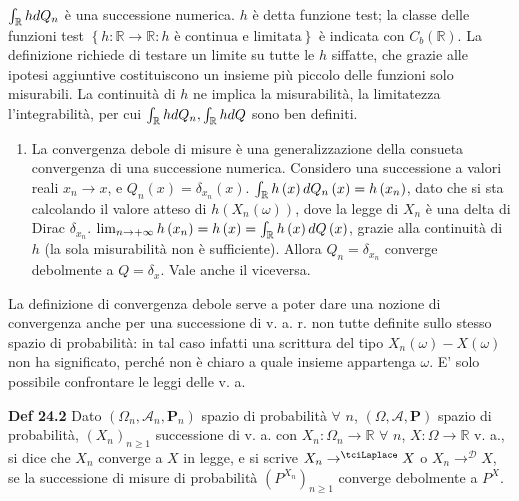 \documentclass{article}
\begin{document}
$\int_{%
\mathbb{R}
}hdQ_{n}$ \`{e} una successione numerica. $h$ \`{e} detta funzione test; la
classe delle funzioni test $\left\{ h:%
\mathbb{R}
\rightarrow 
\mathbb{R}
:h\text{ \`{e} continua e limitata}\right\} $ \`{e} indicata con $%
C_{b}\left( 
\mathbb{R}
\right) $. La definizione richiede di testare un limite su tutte le $h$
siffatte, che grazie alle ipotesi aggiuntive costituiscono un insieme pi\`{u}
piccolo delle funzioni solo misurabili. La continuit\`{a} di $h$ ne implica
la misurabilit\`{a}, la limitatezza l'integrabilit\`{a}, per cui $\int_{%
\mathbb{R}
}hdQ_{n},\int_{%
\mathbb{R}
}hdQ$ sono ben definiti.

\begin{enumerate}
\item La convergenza debole di misure \`{e} una generalizzazione della
consueta convergenza di una successione numerica. Considero una successione
a valori reali $x_{n}\rightarrow x$, e $Q_{n}\left( x\right) =\delta
_{x_{n}}\left( x\right) $. $\int_{%
\mathbb{R}
}h\left( x\right) dQ_{n}\left( x\right) =h\left( x_{n}\right) $, dato che si
sta calcolando il valore atteso di $h\left( X_{n}\left( \omega \right)
\right) $, dove la legge di $X_{n}$ \`{e} una delta di Dirac $\delta
_{x_{n}} $. $\lim_{n\rightarrow +\infty }h\left( x_{n}\right) =h\left(
x\right) =\int_{%
\mathbb{R}
}h\left( x\right) dQ\left( x\right) $, grazie alla continuit\`{a} di $h$ (la
sola misurabilit\`{a} non \`{e} sufficiente). Allora $Q_{n}=\delta _{x_{n}}$
converge debolmente a $Q=\delta _{x}$. Vale anche il viceversa.
\end{enumerate}

La definizione di convergenza debole serve a poter dare una nozione di
convergenza anche per una successione di v. a. r. non tutte definite sullo
stesso spazio di probabilit\`{a}: in tal caso infatti una scrittura del tipo 
$X_{n}\left( \omega \right) -X\left( \omega \right) $ non ha significato,
perch\'{e} non \`{e} chiaro a quale insieme appartenga $\omega $. E' solo
possibile confrontare le leggi delle v. a.

\textbf{Def 24.2} Dato $\left( \Omega _{n},\mathcal{A}_{n},\mathbf{P}%
_{n}\right) $ spazio di probabilit\`{a} $\forall $ $n$, $\left( \Omega ,%
\mathcal{A},\mathbf{P}\right) $ spazio di probabilit\`{a}, $\left(
X_{n}\right) _{n\geq 1}$ successione di v. a. con $X_{n}:\Omega
_{n}\rightarrow 
\mathbb{R}
$ $\forall $ $n$, $X:\Omega \rightarrow 
\mathbb{R}
$ v. a., si dice che $X_{n}$ converge a $X$ in legge, e si scrive $%
X_{n}\rightarrow ^{\tciLaplace }X$ o $X_{n}\rightarrow ^{\mathcal{D}}X$, se
la successione di misure di probabilit\`{a} $\left( P^{X_{n}}\right) _{n\geq
1}$ converge debolmente a $P^{X}$.
\end{document}
